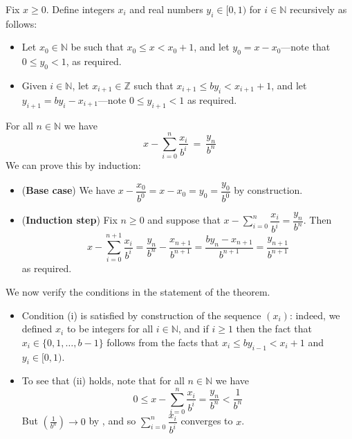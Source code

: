 \begin{cproof}[of existence]
Fix $x \ge 0$. Define integers $x_i$ and real numbers $y_i \in [0,1)$ for $i \in \mathbb{N}$ recursively as follows:
\begin{itemize}
\item Let $x_0 \in \mathbb{N}$ be such that $x_0 \le x < x_0+1$, and let $y_0 = x-x_0$---note that $0 \le y_0 < 1$, as required.
\item Given $i \in \mathbb{N}$, let $x_{i+1} \in \mathbb{Z}$ such that $x_{i+1} \le by_i < x_{i+1}+1$, and let $y_{i+1} = by_i-x_{i+1}$---note $0 \le y_{i+1} < 1$ as required.
\end{itemize}

For all $n \in \mathbb{N}$ we have
\[ x - \sum_{i=0}^n \dfrac{x_i}{b^i} ~=~ \dfrac{y_n}{b^n} \]
We can prove this by induction:
\begin{itemize}
\item (\textbf{Base case}) We have $x - \dfrac{x_0}{b^0} = x-x_0 = y_0 = \dfrac{y_0}{b^0}$ by construction.
\item (\textbf{Induction step}) Fix $n \ge 0$ and suppose that $x - \displaystyle\sum_{i=0}^n \dfrac{x_i}{b^i} = \dfrac{y_n}{b^n}$. Then
\[ x - \sum_{i=0}^{n+1} \dfrac{x_i}{b^i} = \dfrac{y_n}{b^n} - \dfrac{x_{n+1}}{b^{n+1}} = \dfrac{by_n - x_{n+1}}{b^{n+1}} = \dfrac{y_{n+1}}{b^{n+1}} \]
as required.
\end{itemize}

We now verify the conditions in the statement of the theorem.
\begin{itemize}
\item Condition (i) is satisfied by construction of the sequence $(x_i)$: indeed, we defined $x_i$ to be integers for all $i \in \mathbb{N}$, and if $i \ge 1$ then the fact that $x_i \in \{ 0,1,\dots,b-1 \}$ follows from the facts that $x_i \le by_{i-1} < x_i+1$ and $y_i \in [0,1)$.
\item To see that (ii) holds, note that for all $n \in \mathbb{N}$ we have
\[ 0 \le x - \sum_{i=0}^n \dfrac{x_i}{b^i} = \dfrac{y_n}{b^n} < \dfrac{1}{b^n} \]
But $(\frac{1}{b^n}) \to 0$ by , and so $\sum_{i=0}^n \dfrac{x_i}{b^i}$ converges to $x$.


\end{itemize}
\end{cproof}
